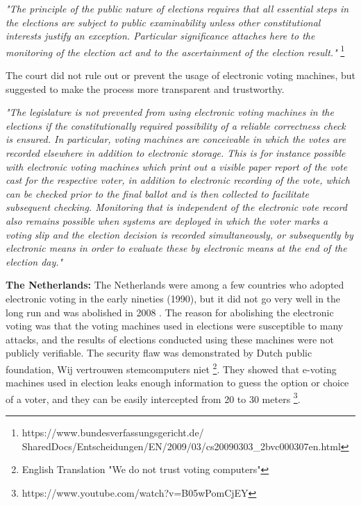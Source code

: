   \textit{"The principle of the public nature of elections requires that all 
  essential steps in the elections are subject to public examinability
  unless other constitutional interests justify an exception. 
  Particular significance attaches here to the monitoring of the 
  election act and to the ascertainment of the election result."}
  \footnote{https://www.bundesverfassungsgericht.de/
  SharedDocs/Entscheidungen/EN/2009/03/cs20090303\_2bvc000307en.html}
 
  \noindent	
  The court did not rule out or prevent the usage of electronic 
  voting machines,  but suggested to make the process more 
  transparent and trustworthy.  
  
  \textit{"The legislature is not prevented from using electronic voting machines 
  in the elections if the constitutionally required possibility of a 
  reliable correctness check is ensured. In particular, voting machines 
  are conceivable in which the votes are recorded elsewhere in addition
   to electronic storage. This is for instance possible with electronic
   voting machines which print out a visible paper report of the vote 
   cast for the respective voter, in addition to electronic recording 
   of the vote, which can be checked prior to the final ballot and is
    then collected to facilitate subsequent checking. Monitoring that is
     independent of the electronic vote record also remains possible when
     systems are deployed in which the voter marks a voting slip and the 
     election decision is recorded simultaneously, 
     or subsequently by electronic means in 
     order to evaluate these by electronic means at the end of the 
     election day."}
  
  \textbf{The Netherlands:}
  The Netherlands were among a few countries who adopted electronic voting 
  in the early nineties (1990), but it did not go very well in the long 
  run and was abolished in 2008 \citep{Jacobs2009}. 
  The reason for abolishing the electronic voting was that   
  the voting machines used in elections were susceptible to many attacks,
  and the results of elections conducted using these machines 
  were not publicly verifiable.  The security flaw was demonstrated by 
  Dutch public foundation, Wij vertrouwen stemcomputers niet
  \footnote{English Translation "We do not trust voting computers"}. 
  They showed that e-voting machines used in election leaks enough
  information to guess the option or choice of a voter, 
  and they can be easily intercepted from 20 to 30 meters
  \footnote{https://www.youtube.com/watch?v=B05wPomCjEY}. 
  
